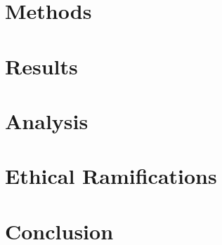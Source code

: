 \documentclass[11pt]{article}
\begin{document}
\section{Methods}

\section{Results}

\section{Analysis}

\section{Ethical Ramifications}


\section{Conclusion}



\end{document}
